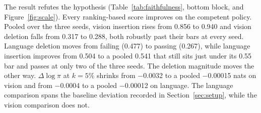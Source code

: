 \documentclass{article}
\begin{document}
The result refutes the hypothesis (Table~\ref{tab:faithfulness}, bottom block, and Figure~\ref{fig:scale}).
Every ranking-based score improves on the competent policy.
Pooled over the three seeds, vision insertion rises from 0.856 to 0.940 and vision deletion falls from 0.317 to 0.288, both robustly past their bars at every seed. Language deletion moves from failing (0.477) to passing (0.267), while language insertion improves from 0.504 to a pooled 0.541 that still sits just under its 0.55 bar and passes at only two of the three seeds.
The deletion magnitude moves the other way.
$\Delta\log\pi$ at $k{=}5\%$ shrinks from $-$0.0032 to a pooled $-$0.00015 nats on vision and from $-$0.0004 to a pooled $-$0.00012 on language.
The language comparison spans the baseline deviation recorded in Section~\ref{sec:setup}, while the vision comparison does not.
\end{document}
